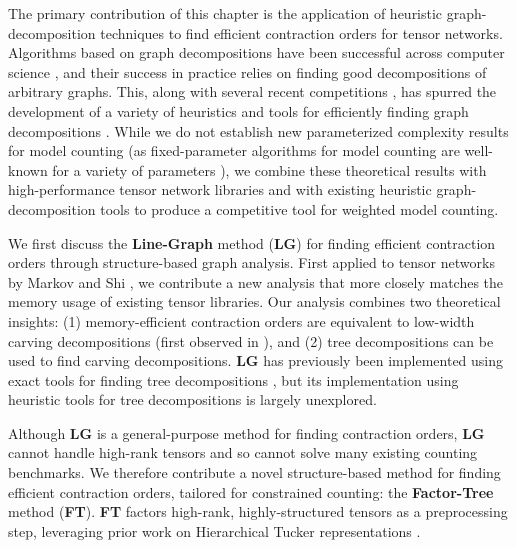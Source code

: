 The primary contribution of this chapter is the application of heuristic graph-decomposition techniques to find efficient contraction orders for tensor networks. Algorithms based on graph decompositions have been successful across computer science \cite{GLST17,MPPV04}, and their success in practice relies on finding good decompositions of arbitrary graphs. This, along with several recent competitions \cite{DKTW18}, has spurred the development of a variety of heuristics and tools for efficiently finding graph decompositions \cite{AMW17,HS18,Tamaki17}. While we do not establish new parameterized complexity results for model counting (as fixed-parameter algorithms for model counting are well-known for a variety of parameters \cite{FMR08,SS10}), we combine these theoretical results with high-performance tensor network libraries and with existing heuristic graph-decomposition tools to produce a competitive tool for weighted model counting.

We first discuss the \textbf{Line-Graph} method (\textbf{LG}) for finding efficient contraction orders through structure-based graph analysis. First applied to tensor networks by Markov and Shi , we contribute a new analysis that more closely matches the memory usage of existing tensor libraries. Our analysis combines two theoretical insights: (1) memory-efficient contraction orders are equivalent to low-width carving decompositions (first observed in \cite{de15}), and (2) tree decompositions can be used to find carving decompositions. \textbf{LG} has previously been implemented using exact tools for finding tree decompositions \cite{DFGHSW18}, but its implementation using heuristic tools for tree decompositions is largely unexplored.

Although \textbf{LG} is a general-purpose method for finding contraction orders, \textbf{LG} cannot handle high-rank tensors and so cannot solve many existing counting benchmarks. We therefore contribute a novel structure-based method for finding efficient contraction orders, tailored for constrained counting: the \textbf{Factor-Tree} method (\textbf{FT}). \textbf{FT} factors high-rank, highly-structured tensors as a preprocessing step, leveraging prior work on Hierarchical Tucker representations \cite{Grasedyck10}.

